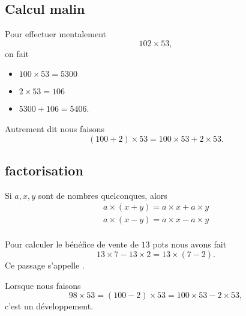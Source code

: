 \subsection{Calcul malin}

Pour effectuer mentalement
\begin{equation}
    102\times 53,
\end{equation}
on fait
\begin{itemize}
    \item \( 100\times 53=5300\)
    \item \( 2\times 53=106\)
    \item \( 5300+106=5406\).
\end{itemize}
Autrement dit nous faisons
\begin{equation}
    (100+2)\times 53=100\times 53+2\times 53.
\end{equation}

\subsection{factorisation}

Si \( a,x,y\) sont de nombres quelconques, alors
\begin{subequations}
    \begin{align}
        a\times (x+y)=a\times x+a\times y\\
        a\times (x-y)=a\times x-a\times y\\
    \end{align}
\end{subequations}

\begin{example}
    Pour calculer le bénéfice de vente de \( 13\) pots nous avons fait
    \begin{equation}
        13\times 7-13\times 2=13\times (7-2).
    \end{equation}
    Ce passage s'appelle .
\end{example}

\begin{example}
    Lorsque nous faisons
    \begin{equation}
        98\times 53=(100-2)\times 53=100\times 53-2\times 53,
    \end{equation}
    c'est un développement.
\end{example}
